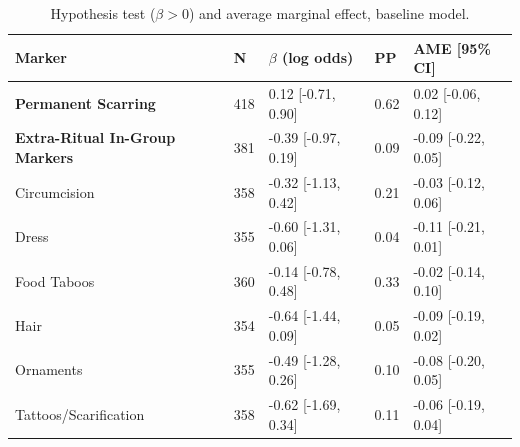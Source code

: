 \begin{table}[!ht]
\centering
\small
\caption{Hypothesis test ($\beta > 0$) and average marginal effect, baseline model.}
\label{tab:intonly_hypothesis_ame_baseline}
\begin{tabular}{lllll}
\toprule
Marker & N & $\beta$ (log odds) & PP & AME [95\% CI] \\
\midrule
\textbf{Permanent Scarring} & 418 & 0.12 [-0.71, 0.90] & 0.62 & 0.02 [-0.06, 0.12] \\
\textbf{Extra-Ritual In-Group Markers} & 381 & -0.39 [-0.97, 0.19] & 0.09 & -0.09 [-0.22, 0.05] \\
\midrule
Circumcision & 358 & -0.32 [-1.13, 0.42] & 0.21 & -0.03 [-0.12, 0.06] \\
Dress & 355 & -0.60 [-1.31, 0.06] & 0.04 & -0.11 [-0.21, 0.01] \\
Food Taboos & 360 & -0.14 [-0.78, 0.48] & 0.33 & -0.02 [-0.14, 0.10] \\
Hair & 354 & -0.64 [-1.44, 0.09] & 0.05 & -0.09 [-0.19, 0.02] \\
Ornaments & 355 & -0.49 [-1.28, 0.26] & 0.10 & -0.08 [-0.20, 0.05] \\
Tattoos/Scarification & 358 & -0.62 [-1.69, 0.34] & 0.11 & -0.06 [-0.19, 0.04] \\
\bottomrule
\end{tabular}
\end{table}